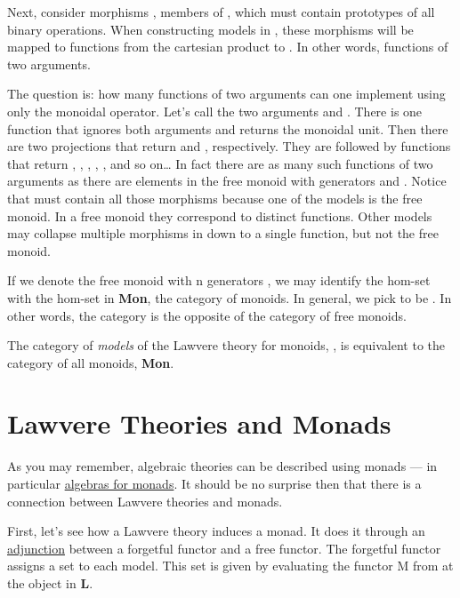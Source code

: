Next, consider morphisms , members of
, which must contain prototypes of all binary
operations. When constructing models in , these
morphisms will be mapped to functions from the cartesian product
 to . In other words, functions of
two arguments.

The question is: how many functions of two arguments can one implement
using only the monoidal operator. Let's call the two arguments
 and . There is one function that ignores both
arguments and returns the monoidal unit. Then there are two projections
that return  and , respectively. They are followed
by functions that return , , ,
, , and so on\ldots{} In fact there are as many
such functions of two arguments as there are elements in the free monoid
with generators  and . Notice that
 must contain all those morphisms because one of the
models is the free monoid. In a free monoid they correspond to distinct
functions. Other models may collapse multiple morphisms in
 down to a single function, but not the free monoid.

If we denote the free monoid with n generators , we may
identify the hom-set  with the hom-set
 in \textbf{Mon}, the category of monoids. In
general, we pick  to be . In
other words, the category  is the opposite of the category
of free monoids.

The category of \emph{models} of the Lawvere theory for monoids,
, is equivalent to the category of all monoids,
\textbf{Mon}.

\section{Lawvere Theories and Monads}\label{lawvere-theories-and-monads}

As you may remember, algebraic theories can be described using monads
--- in particular
\hyperref[algebras-for-monads]{algebras
for monads}. It should be no surprise then that there is a connection
between Lawvere theories and monads.

First, let's see how a Lawvere theory induces a monad. It does it
through an
\hyperref[free-forgetful-adjunctions]{adjunction}
between a forgetful functor and a free functor. The forgetful functor
 assigns a set to each model. This set is given by evaluating
the functor M from  at the object  in
\textbf{L}.

